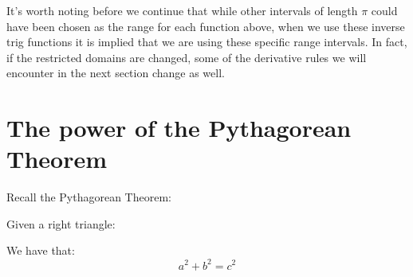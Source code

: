 \documentclass{ximera}
\begin{document}
It's worth noting before we continue that while other intervals of length $\pi$ could have been chosen as the range for each function above, when we use these inverse trig functions it is implied that we are using these specific range intervals. In fact, if the restricted domains are changed, some of the derivative rules we will encounter in the next section change as well.

\section{The power of the Pythagorean Theorem}

Recall the Pythagorean Theorem:


\begin{theorem}
Given a right triangle:
\begin{image}[2in]
\end{image}
We have that:
\[
a^2 + b^2 = c^2
\]
\end{theorem}
\end{document}
